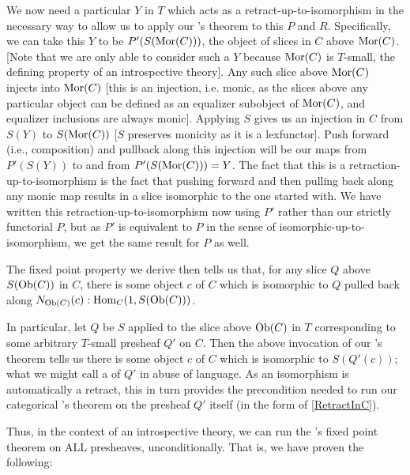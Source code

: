 We now need a particular $Y$ in $T$ which acts as a retract-up-to-isomorphism in the necessary way to allow us to apply our \Loeb's theorem to this $P$ and $R$. Specifically, we can take this $Y$ to be $P'(S(\operatorname{Mor}(C)))$, the object of slices in $C$ above $\operatorname{Mor}(C)$. [Note that we are only able to consider such a $Y$ because $\operatorname{Mor}(C)$ is $T$-small, the defining property of an introspective theory]. Any such slice above $\operatorname{Mor}(C)$ injects into $\operatorname{Mor}(C)$ [this is an injection, i.e. monic, as the slices above any particular object can be defined as an equalizer subobject of $\operatorname{Mor}(C)$, and equalizer inclusions are always monic]. Applying $S$ gives us an injection in $C$ from $S(Y)$ to $S(\operatorname{Mor}(C))$ [$S$ preserves monicity as it is a lexfunctor]. Push forward (i.e., composition) and pullback along this injection will be our maps from $P'(S(Y))$ to and from $P'(S(\operatorname{Mor}(C))) = Y$. The fact that this is a retraction-up-to-isomorphism is the fact that pushing forward and then pulling back along any monic map results in a slice isomorphic to the one started with. We have written this retraction-up-to-isomorphism now using $P'$ rather than our strictly functorial $P$, but as $P'$ is equivalent to $P$ in the sense of isomorphic-up-to-isomorphism, we get the same result for $P$ as well. 

The fixed point property we derive then tells us that, for any slice $Q$ above $S(\operatorname{Ob}(C))$ in $C$, there is some object $c$ of $C$ which is isomorphic to $Q$ pulled back along $N_{\operatorname{Ob}(C)}(c) : \operatorname{Hom}_C(1, S(\operatorname{Ob}(C)))$. 

In particular, let $Q$ be $S$ applied to the slice above $\operatorname{Ob}(C)$ in $T$ corresponding to some arbitrary $T$-small presheaf $Q'$ on $C$. Then the above invocation of our \Loeb's theorem tells us there is some object $c$ of $C$ which is isomorphic to $S(Q'(c))$; what we might call a  of $Q'$ in abuse of language. As an isomorphism is automatically a retract, this in turn provides the precondition needed to run our categorical \Loeb's theorem on the presheaf $Q'$ itself (in the form of \cref{RetractInC}).

Thus, in the context of an introspective theory, we can run the \Loeb's fixed point theorem on ALL presheaves, unconditionally. That is, we have proven the following:

